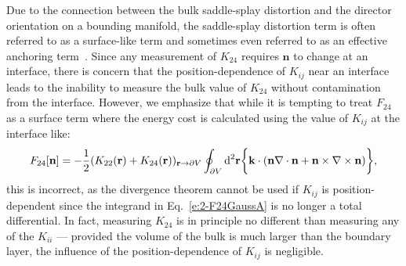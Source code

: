 Due to the connection between the bulk saddle-splay distortion and the director orientation on a bounding manifold, the saddle-splay distortion term is often referred to as a surface-like term and sometimes even referred to as an effective anchoring term~\cite{RN206,RN33,RN194,RN58,RN57,RN151}.
Since any measurement of $K_{24}$ requires $\mathbf{n}$ to change at an interface, there is concern that the position-dependence of $K_{ij}$ near an interface leads to the inability to measure the bulk value of $K_{24}$ without contamination from the interface.
However, we emphasize that while it is tempting to treat $F_{24}$ as a surface term where the energy cost is calculated using the value of $K_{ij}$ at the interface like:
\begin{equation}
  F_{24}[\mathbf{n}] = - \frac{1}{2}(K_{22}(\mathbf{r}) + K_{24}(\mathbf{r}))_{\mathbf{r} \rightarrow \partial V} \oint_{\partial V} \textup{d}^2  \mathbf{r} \bigg \{   \mathbf{k} \cdot (\mathbf{n}\nabla \cdot \mathbf{n} + \mathbf{n} \times \nabla \times \mathbf{n}) \bigg \},
\end{equation}
this is incorrect, as the divergence theorem cannot be used if $K_{ij}$ is position-dependent since the integrand in Eq.~\ref{e:2-F24GaussA} is no longer a total differential.
In fact, measuring $K_{24}$ is in principle no different than measuring any of the $K_{ii}$ --- provided the volume of the bulk is much larger than the boundary layer, the influence of the position-dependence of $K_{ij}$ is negligible.

